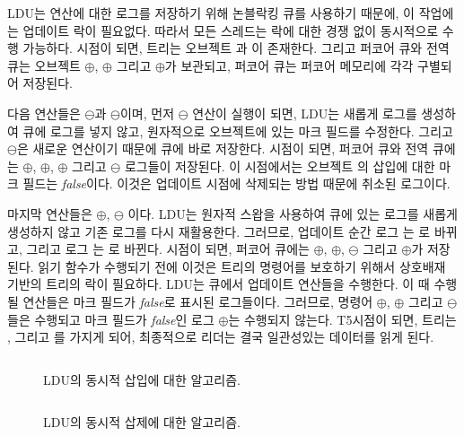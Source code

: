LDU는 연산에 대한 로그를 저장하기 위해 논블락킹 큐를 사용하기 때문에, 
이 작업에는 업데이트 락이 필요없다. 
따라서 모든 스레드는 락에 대한 경쟁 없이 동시적으로 수행 가능하다.
 시점이 되면, 트리는 오브젝트 과 이 존재한다.
그리고 퍼코어 큐와 전역 큐는 오브젝트 $\oplus$, $\oplus$ 그리고
$\oplus$가 보관되고, 퍼코어 큐는 퍼코어 메모리에 각각 구별되어 저장된다.

다음 연산들은 $\ominus$과 $\ominus$이며,
먼저 $\ominus$ 연산이 실행이 되면, LDU는 새롭게 로그를 생성하여 큐에 로그를 넣지 않고, 
원자적으로 오브젝트에 있는 마크 필드를 수정한다. 
그리고 $\ominus$은 새로운 연산이기 때문에 큐에 바로 저장한다. 
 시점이 되면, 퍼코어 큐와 전역 큐에는 $\oplus$, $\oplus$,
$\oplus$ 그리고 $\ominus$ 로그들이 저장된다. 
이 시점에서는 오브젝트 의 삽입에 대한 마크 필드는 \textit{false}이다. 
이것은 업데이트 시점에 삭제되는 방법 때문에 취소된 로그이다. 

마지막 연산들은 $\oplus$, $\ominus$ 이다. 
LDU는 원자적 스왑을 사용하여 큐에 있는 로그를 새롭게 생성하지 않고 기존 로그를 다시 재활용한다. 
그러므로, 업데이트 순간 로그 는 로 바뀌고, 그리고 로그 는 로
바뀐다.
 시점이 되면, 퍼코어 큐에는 $\oplus$, $\oplus$,
$\ominus$ 그리고 $\oplus$가 저장된다. 
읽기 함수가 수행되기 전에 이것은 트리의 명령어를 보호하기 위해서
상호배재 기반의 트리의 락이 필요하다. 
LDU는 큐에서 업데이트 연산들을 수행한다. 
이 때 수행될 연산들은 마크 필드가 \textit{false}로 표시된 로그들이다.
그러므로, 명령어 $\oplus$, $\oplus$ 그리고 $\ominus$
들은 수행되고  마크 필드가 \textit{false}인 로그 $\oplus$는 수행되지 않는다. 
T5시점이 되면, 트리는 ,  그리고 를 가지게 되어, 
최종적으로 리더는 결국 일관성있는 데이터를 읽게 된다. 

\begin{figure}[h!]
\begin{center}
\inputminted[linenos,fontsize=\footnotesize, tabsize=4]{c}{src/ldu_logical_a.c}
\end{center}
\caption{LDU의 동시적 삽입에 대한 알고리즘.}
\label{fig:gldulogicalupdate}
\end{figure}


\begin{figure}[h!]
\begin{center}
\inputminted[linenos,fontsize=\footnotesize, tabsize=4]{c}{src/ldu_logical_b.c}
\end{center}
\caption{LDU의 동시적 삽제에 대한 알고리즘.}
\label{fig:gldulogicalupdate}
\end{figure}


